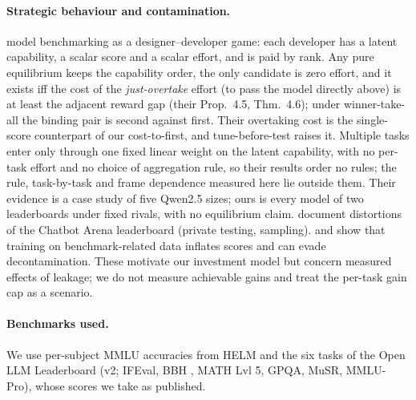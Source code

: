 \paragraph{Strategic behaviour and contamination.}
\citet{chen2026incentives} model benchmarking as a designer--developer game: each developer has a latent capability, a scalar score and a scalar effort, and is paid by rank. Any pure equilibrium keeps the capability order, the only candidate is zero effort, and it exists iff the cost of the \emph{just-overtake} effort (to pass the model directly above) is at least the adjacent reward gap (their Prop.~4.5, Thm.~4.6); under winner-take-all the binding pair is second against first. Their overtaking cost is the single-score counterpart of our cost-to-first, and tune-before-test raises it. Multiple tasks enter only through one fixed linear weight on the latent capability, with no per-task effort and no choice of aggregation rule, so their results order no rules; the rule, task-by-task and frame dependence measured here lie outside them. Their evidence is a case study of five Qwen2.5 sizes; ours is every model of two leaderboards under fixed rivals, with no equilibrium claim. \citet{singh2025illusion} document distortions of the Chatbot Arena leaderboard (private testing, sampling). \citet{zhou2023cheater} and \citet{yang2023rephrased} show that training on benchmark-related data inflates scores and can evade decontamination. These motivate our investment model but concern measured effects of leakage; we do not measure achievable gains and treat the per-task gain cap as a scenario.
\paragraph{Benchmarks used.}
We use per-subject MMLU \citep{hendrycks2020mmlu} accuracies from HELM \citep{liang2022helm} and the six tasks of the Open LLM Leaderboard (v2; IFEval, BBH \citealp{suzgun2022bbh}, MATH Lvl 5, GPQA, MuSR, MMLU-Pro), whose scores we take as published.
